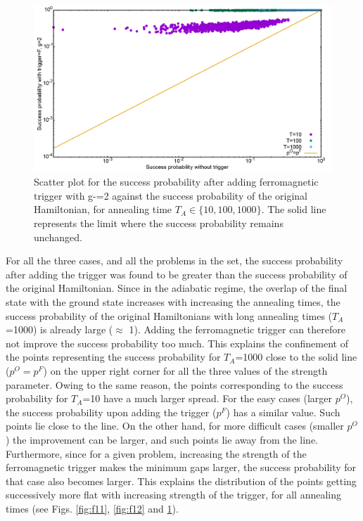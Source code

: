 \documentclass[../main.tex]{subfiles}
\begin{document}
\begin{figure}[H]
\centering
\includegraphics[scale=0.24]{Scatt_s12_F_g2.png}
\caption{Scatter plot for the success probability after adding ferromagnetic trigger with g-=2 against the success probability of the original Hamiltonian, for annealing time $T_A \in \{10,100,1000\}$. The solid line represents the limit where the success probability remains unchanged.}
\label{fig:f13}
\end{figure}

For all the three cases, and all the problems in the set, the success probability after adding the trigger was found to be greater than the success probability of the original Hamiltonian. Since in the adiabatic regime, the overlap of the final state with the ground state increases with increasing the annealing times, the success probability of the original Hamiltonians with long annealing times ($T_A$=1000) is already large ($\approx$ 1). Adding the ferromagnetic trigger can therefore not improve the success probability too much. This explains the confinement of the points representing the success probability for $T_A$=1000 close to the solid line ($p^O=p^F$) on the upper right corner for all the three values of the strength parameter. Owing to the same reason, the points corresponding to the success probability for $T_A$=10 have a much larger spread. For the easy cases (larger $p^O$), the success probability upon adding the trigger ($p^F$) has a similar value. Such points lie close to the line. On the other hand, for more difficult cases (smaller $p^O$) the improvement can be larger, and such points lie away from the line.\\

Furthermore, since for a given problem, increasing the strength of the ferromagnetic trigger makes the minimum gaps larger, the success probability for that case also becomes larger. This explains the distribution of the points getting successively more flat with increasing strength of the trigger, for all annealing times (see Figs. \ref{fig:f11}, \ref{fig:f12} and \ref{fig:f13}).\\
\end{document}
